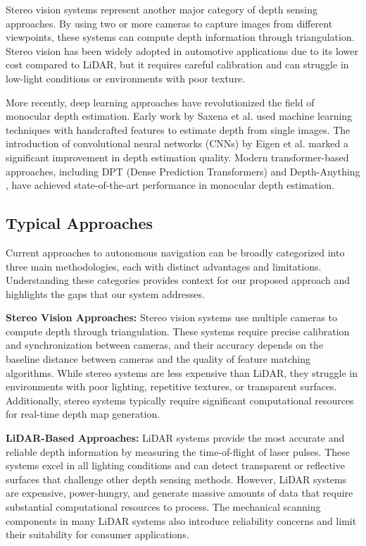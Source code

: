 \documentclass[conference]{IEEEtran}
\begin{document}
Stereo vision systems represent another major category of depth sensing approaches. By using two or more cameras to capture images from different viewpoints, these systems can compute depth information through triangulation. Stereo vision has been widely adopted in automotive applications due to its lower cost compared to LiDAR, but it requires careful calibration and can struggle in low-light conditions or environments with poor texture.

More recently, deep learning approaches have revolutionized the field of monocular depth estimation. Early work by Saxena et al. \cite{b4} used machine learning techniques with handcrafted features to estimate depth from single images. The introduction of convolutional neural networks (CNNs) by Eigen et al. \cite{b5} marked a significant improvement in depth estimation quality. Modern transformer-based approaches, including DPT (Dense Prediction Transformers) \cite{b6} and Depth-Anything \cite{b3}, have achieved state-of-the-art performance in monocular depth estimation.

\subsection{Typical Approaches}
Current approaches to autonomous navigation can be broadly categorized into three main methodologies, each with distinct advantages and limitations. Understanding these categories provides context for our proposed approach and highlights the gaps that our system addresses.

\textbf{Stereo Vision Approaches:} Stereo vision systems use multiple cameras to compute depth through triangulation. These systems require precise calibration and synchronization between cameras, and their accuracy depends on the baseline distance between cameras and the quality of feature matching algorithms. While stereo systems are less expensive than LiDAR, they struggle in environments with poor lighting, repetitive textures, or transparent surfaces. Additionally, stereo systems typically require significant computational resources for real-time depth map generation.

\textbf{LiDAR-Based Approaches:} LiDAR systems provide the most accurate and reliable depth information by measuring the time-of-flight of laser pulses. These systems excel in all lighting conditions and can detect transparent or reflective surfaces that challenge other depth sensing methods. However, LiDAR systems are expensive, power-hungry, and generate massive amounts of data that require substantial computational resources to process. The mechanical scanning components in many LiDAR systems also introduce reliability concerns and limit their suitability for consumer applications.
\end{document}
